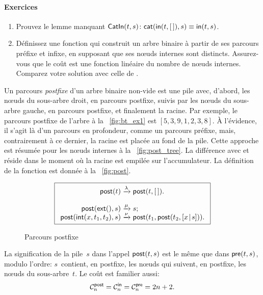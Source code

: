 \paragraph{Exercices}
\begin{enumerate}

  \item Prouvez le lemme manquant \(\textsf{CatIn}({t,s}) \colon
  \textsf{cat}(\textsf{in}(t,[\,]),s) \equiv
  \textsf{in}(t,s)\).

 \item Définissez une fonction qui construit un arbre binaire à partir
  de ses parcours préfixe et infixe, en supposant que ses nœuds
  internes sont distincts. Assurez-vous que le coût est une fonction
  linéaire du nombre de nœuds internes. Comparez votre solution
  avec celle de \cite{MuBird_2003}.

\end{enumerate}


Un parcours \emph{postfixe} d'un arbre
binaire non-vide est une pile avec, d'abord, les nœuds du
sous-arbre droit, en parcours postfixe, suivis par les nœuds du
sous-arbre gauche, en parcours postfixe, et finalement la racine. Par
exemple, le parcours postfixe de l'arbre à la \fig~\vref{fig:bt_ex1}
est \([5,3,9,1,2,3,8]\). À l'évidence, il s'agit là d'un parcours en
profondeur, comme un
parcours préfixe, mais, contrairement à ce dernier, la racine est
placée au fond de la pile. Cette approche est résumée pour les
nœuds internes à la \fig~\vref{fig:post_tree}. La différence avec
 et 
réside dans le moment où la racine est empilée sur l'accumulateur. La
définition de la fonction est donnée à la \fig~\vref{fig:post}.
\begin{figure}[b]
\begin{equation*}
\boxed{
\begin{array}{r@{\;}c@{\;}l}
\fun{post}(t) & \xrightarrow{\lambda} & \fun{post}(t,\el).\\
\\
\fun{post}(\fun{ext}(),s) & \xrightarrow{\smash{\mu}} & s;\\
\fun{post}(\fun{int}(x,t_1,t_2),s)
  & \xrightarrow{\smash{\nu}}
  & \fun{post}(t_1,\fun{post}(t_2,\cons{x}{s})).
\end{array}}
\end{equation*}
\caption{Parcours postfixe}
\label{fig:post}
\end{figure}
La signification de la pile~\(s\) dans l'appel
\(\textsf{post}(t,s)\)
est le même que dans \(\textsf{pre}(t,s)\), modulo l'ordre:
\(s\)~contient, en postfixe, les nœuds qui suivent, en postfixe,
les nœuds du sous-arbre~\(t\). Le coût est familier aussi:
\begin{equation*}
  \C{\fun{post}}{n} = \C{\fun{in}}{n} = \C{\fun{pre}}{n} = 2n +
  2.\index{post@$\C{\fun{post}}{n}$}
\end{equation*}

